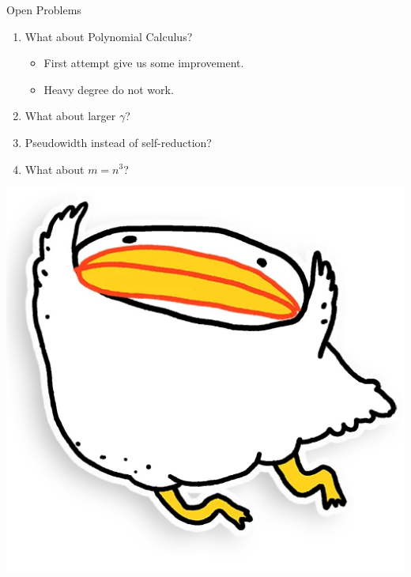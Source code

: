 \begin{frame}{Open Problems}

    \begin{enumerate}
        \item What about Polynomial Calculus?
            \begin{itemize}
                \item First attempt give us some improvement.
                \item Heavy degree do not work.
            \end{itemize}
            \pause
        \item What about larger $\gamma$?
            \pause
        \item Pseudowidth instead of self-reduction?
            \pause
        \item What about $m = n^3$?
    \end{enumerate}

    \pause
    \vspace{0.5cm}
    \begin{center}
        \includegraphics[scale = 0.2]{pics/utia-fly.png}        
    \end{center}

\end{frame}